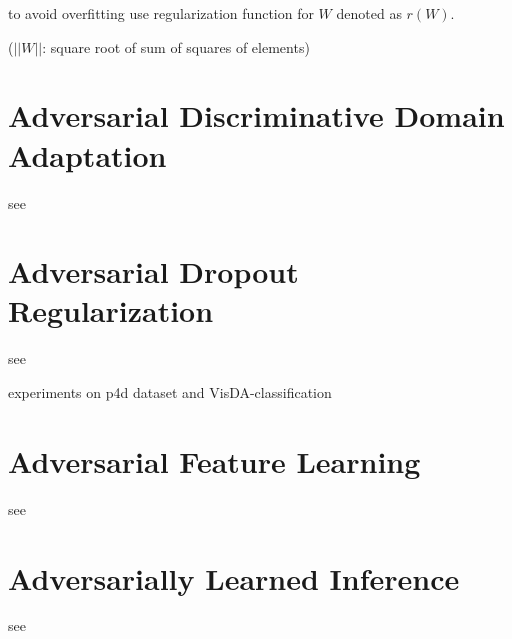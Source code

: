 to avoid overfitting use regularization function for $W$ denoted as $r(W)$. 


($||W||$: square root of sum of squares of elements)


\section{Adversarial Discriminative Domain Adaptation}

see \cite{DBLP:journals/corr/TzengHSD17}


\section{Adversarial Dropout Regularization}

see \cite{DBLP:journals/corr/abs-1711-01575}

experiments on p4d dataset and VisDA-classification\\

\section{Adversarial Feature Learning}

see \cite{DBLP:journals/corr/DonahueKD16}


\section{Adversarially Learned Inference}

see \cite{dumoulin2016adversarially}

